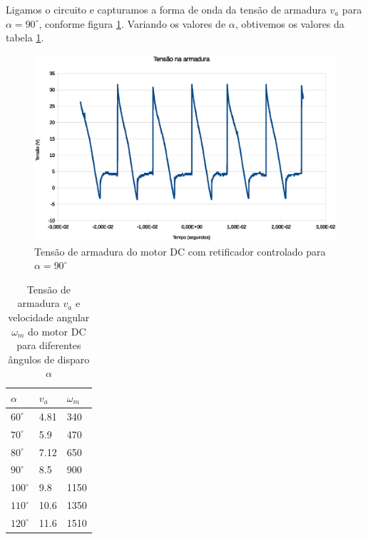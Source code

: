 \documentclass{article}
\begin{document}
Ligamos o circuito e capturamos a forma de onda da tensão de armadura $v_a$ para $\alpha=90^\circ$, conforme figura \ref{fig:varet}. Variando os valores de $\alpha$, obtivemos os valores da tabela \ref{tab:varet}.

\begin{figure}[H]
	\centering
	\includegraphics[width=\linewidth]{Dados/Retificador/1}
	\caption{Tensão de armadura do motor DC com retificador controlado para $\alpha=90^\circ$}
	\label{fig:varet}
\end{figure}

\begin{table}[H]
	\centering
	\caption{Tensão de armadura $v_a$ e velocidade angular $\omega_m$ do motor DC para diferentes ângulos de disparo $\alpha$}
	\label{tab:varet}
	\begin{tabular}{|l|l|l|}
		\hline
		$\alpha$ & $v_a$ & $\omega_m$ \\ \hline
		$60^\circ$    & 4.81  & 340        \\ \hline
		$70^\circ$    & 5.9   & 470        \\ \hline
		$80^\circ$    & 7.12  & 650        \\ \hline
		$90^\circ$    & 8.5   & 900        \\ \hline
		$100^\circ$   & 9.8   & 1150       \\ \hline
		$110^\circ$   & 10.6  & 1350       \\ \hline
		$120^\circ$   & 11.6  & 1510       \\ \hline
	\end{tabular}
\end{table}
\end{document}
